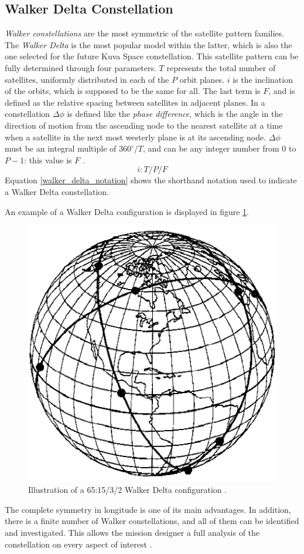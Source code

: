\subsection{Walker Delta Constellation}
\textit{Walker constellations} are the most symmetric of the satellite pattern families.
The \textit{Walker Delta} is the most popular model within the latter, which is also the one selected for the future Kuva Space constellation.
This satellite pattern can be fully determined through four parameters. 
$T$ represents the total number of satellites, uniformly distributed in each of the $P$ orbit planes.
$i$ is the inclination of the orbits, which is supposed to be the same for all.
The last term is $F$, and is defined as the relative spacing between satellites in adjacent planes.
In a constellation $\Delta \phi$ is defined like the \textit{phase difference}, which is the angle in the direction of motion from the ascending node to the nearest satellite at a time when a satellite in the next most westerly plane is at its ascending node.
$\Delta \phi$ must be an integral multiple of $360^\circ / T$, and can be any integer number from $0$ to $P-1$: this value is $F$ \cite{wertz2009orbit}.
\begin{equation} \label{walker_delta_notation}
    i : T/P/F
\end{equation}
Equation \ref{walker_delta_notation} shows the shorthand notation used to indicate a Walker Delta constellation.

An example of a Walker Delta configuration is displayed in figure \ref{walker_delta_representation}.
\begin{figure}[h]
    \centering
    \includegraphics[scale=0.5]{img/walker_delta.png}        
    \caption{Illustration of a 65:15/3/2 Walker Delta configuration \cite{wertz2009orbit}.}
    \label{walker_delta_representation}
\end{figure}
The complete symmetry in longitude is one of its main advantages.
In addition, there is a finite number of Walker constellations, and all of them can be identified and investigated.
This allows the mission designer a full analysis of the constellation on every aspect of interest \cite{wertz2009orbit}. 

